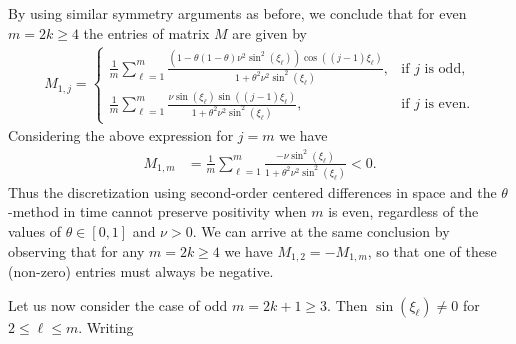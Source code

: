 \documentclass[a4paper]{article}
\newtheorem{remark}{Remark}
\newcommand{\te}{\theta}
\begin{document}
\begin{description}[style=unboxed,leftmargin=0cm]
\item [{Case 1:} $m$ is {even}.]
\item \noindent By using similar symmetry arguments as before, we conclude that for {even} $m=2k\ge 4$
the entries of matrix $M$ are given by
\begin{align*}
	M_{1,j} = \begin{cases}
				\displaystyle
				\frac{1}{m} \sum_{\ell=1}^{m}\frac{\left(1-\theta(1-\theta)\nu^2\sin^2(\xi_\ell)
					\right)\cos((j-1)\xi_\ell)}{1+\theta^2\nu^2\sin^2(\xi_\ell)}, &\mbox{if } j
					\text{ is odd}, \\[20pt]
				\displaystyle
				\frac{1}{m} \sum_{\ell=1}^{m} \frac{\nu \sin(\xi_\ell)\sin((j-1)\xi_\ell)}
					{1+\theta^2\nu^2 \sin^2 (\xi_\ell)}, &\mbox{if } j \text{ is even}.
			  \end{cases}
\end{align*}
Considering  the above expression for $j = m$ we have
\begin{align*}
    M_{1,m} & =  \frac{1}{m} \sum_{\ell=1}^{m} \frac{- \nu \sin^2 (\xi_\ell)}{1+\theta^2\nu^2 \sin^2 (\xi_\ell)} < 0.
\end{align*}
Thus the discretization using second-order centered differences in space and the $\theta$-method in time cannot preserve positivity when $m$ is even, regardless of the
values of $\theta\in[0,1]$ and $\nu>0$.
We can arrive at the same conclusion by observing that
for any $m=2k\ge 4$ we have $M_{1,2}=-M_{1,m}$, so that one of
these (non-zero) entries must always be negative.
\item [{Case 2:} $m$ is {odd}.]
\item \noindent Let us now consider the case of {odd} $m=2k+1\ge 3$. Then $\sin(\xi_\ell)\ne0$ for
$2\le\ell\le m$.
Writing

\end{description}
\end{document}

